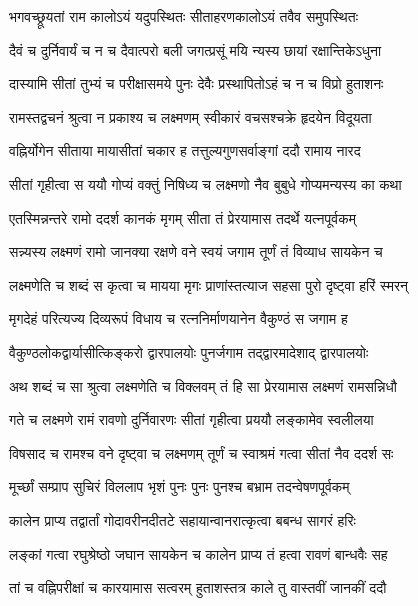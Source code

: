 \twolineshloka
{भगवच्छ्रूयतां राम कालोऽयं यदुपस्थितः}
{सीताहरणकालोऽयं तवैव समुपस्थितः} %

\twolineshloka
{दैवं च दुर्निवार्यं च न च दैवात्परो बली}
{जगत्प्रसूं मयि न्यस्य छायां रक्षान्तिकेऽधुना} %

\twolineshloka
{दास्यामि सीतां तुभ्यं च परीक्षासमये पुनः}
{देवैः प्रस्थापितोऽहं च न च विप्रो हुताशनः} %

\twolineshloka
{रामस्तद्वचनं श्रुत्वा न प्रकाश्य च लक्ष्मणम्}
{स्वीकारं वचसश्चक्रे हृदयेन विदूयता} %

\twolineshloka
{वह्निर्योगेन सीताया मायासीतां चकार ह}
{तत्तुल्यगुणसर्वाङ्‌गां ददौ रामाय नारद} %

\twolineshloka
{सीतां गृहीत्वा स ययौ गोप्यं वक्तुं निषिध्य च}
{लक्ष्मणो नैव बुबुधे गोप्यमन्यस्य का कथा} %

\twolineshloka
{एतस्मिन्नन्तरे रामो ददर्श कानकं मृगम्}
{सीता तं प्रेरयामास तदर्थे यत्‍नपूर्वकम्} %

\twolineshloka
{सन्न्यस्य लक्ष्मणं रामो जानक्या रक्षणे वने}
{स्वयं जगाम तूर्णं तं विव्याध सायकेन च} %

\twolineshloka
{लक्ष्मणेति च शब्दं स कृत्वा च मायया मृगः}
{प्राणांस्तत्याज सहसा पुरो दृष्ट्वा हरिं स्मरन्} %

\twolineshloka
{मृगदेहं परित्यज्य दिव्यरूपं विधाय च}
{रत्‍ननिर्माणयानेन वैकुण्ठं स जगाम ह} %

\twolineshloka
{वैकुण्ठलोकद्वार्यासीत्किङ्‌करो द्वारपालयोः}
{पुनर्जगाम तद्द्वारमादेशाद्‌ द्वारपालयोः} %

\twolineshloka
{अथ शब्दं च सा श्रुत्वा लक्ष्मणेति च विक्लवम्}
{तं हि सा प्रेरयामास लक्ष्मणं रामसन्निधौ} %

\twolineshloka
{गते च लक्ष्मणे रामं रावणो दुर्निवारणः}
{सीतां गृहीत्वा प्रययौ लङ्‌कामेव स्वलीलया} %

\twolineshloka
{विषसाद च रामश्च वने दृष्ट्वा च लक्ष्मणम्}
{तूर्णं च स्वाश्रमं गत्वा सीतां नैव ददर्श सः} %

\twolineshloka
{मूर्च्छां सम्प्राप सुचिरं विललाप भृशं पुनः}
{पुनः पुनश्च बभ्राम तदन्वेषणपूर्वकम्} %

\twolineshloka
{कालेन प्राप्य तद्वार्तां गोदावरीनदीतटे}
{सहायान्वानरात्कृत्वा बबन्ध सागरं हरिः} %

\twolineshloka
{लङ्‌कां गत्वा रघुश्रेष्ठो जघान सायकेन च}
{कालेन प्राप्य तं हत्वा रावणं बान्धवैः सह} %

\twolineshloka
{तां च वह्निपरीक्षां च कारयामास सत्वरम्}
{हुताशस्तत्र काले तु वास्तवीं जानकीं ददौ} %

